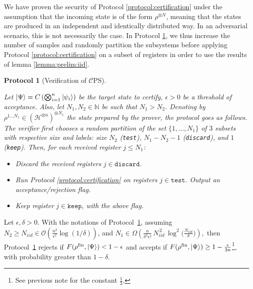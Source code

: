 \documentclass[a4paper,twocolumn,11pt,unpublished]{quantumarticle}
\newtheorem{protocol}{Protocol}
\newcommand{\Hilbert}{\mathcal H}
\newcommand{\CEPS}{$\mathcal C$PS}
\newcommand{\qubit}{i}
\renewcommand{\O}{\mathcal O}
\begin{document}
We have proven the security of Protocol \ref{protocol:certification} under the assumption that the incoming state is of the form $\rho^{\otimes N}$, meaning that the states are produced in an independent and identically distributed way. In an adversarial scenario, this is not necessarily the case. In Protocol \ref{protocol:verification}, we thus increase the number of samples and randomly partition the subsystems before applying Protocol \ref{protocol:certification} on a subset of registers in order to use the results of lemma \ref{lemma:prelim:iid}.

\begin{protocol}[Verification of \CEPS]
\label{protocol:verification}

Let $\ket\Psi = C\left(\bigotimes_{\qubit=1}^n\ket{\psi_\qubit}\right)$ be the target state to certify, $\epsilon>0$ be a threshold of acceptance. Also, let $N_1,N_2\in\mathbb N$ be such that $N_1>N_2$. Denoting by $\rho^{1\ldots N_1}\in(\Hilbert^{\otimes n})^{\otimes N_1}$ the state prepared by the prover,
the protocol goes as follows. The verifier first chooses a random partition of the set $\{1, \ldots, N_1\}$ of $3$ subsets with respective size and labels: 
size $N_{2}$ (\texttt{test}), $N_1-N_2-1$ (\texttt{discard}), and $1$ (\texttt{keep}). Then, for each received register $j\leq N_1$:
\begin{itemize}
    \item Discard the received registers $j\in \texttt{discard}$.
    \item Run Protocol \ref{protocol:certification} on registers $j\in \texttt{test}$. Output an acceptance/rejection flag.
    \item Keep register $j\in\texttt{keep}$, with the above flag.
\end{itemize}
\end{protocol}
     \begin{theorem}[Efficient verification of \CEPS]
            Let $\epsilon,\delta>0$. With the notations of Protocol~\ref{protocol:verification}, assuming 
            $N_2\ge N_{iid}\in\O(\frac{n^2}{\epsilon^2}\log(1/\delta))$,
            and
            \(
            N_1\in\Omega\!\left(
            \frac{n}{\delta^2\epsilon^2}\,N_{{iid}}^{\,2}\,
            \log^2\!\Big(\frac{N_{{iid}}}{\delta}\Big)
            \right),
            \)
            then Protocol~\ref{protocol:verification} rejects if $F(\rho^{\mathrm{fin}},\ket\Psi)<1-\epsilon$ and accepts if $F(\rho^{\mathrm{fin}},\ket\Psi)\ge1-\frac\epsilon{3n}$\footnote{See previous note for the constant $\frac13$.}, with probability greater than $1-\delta$.
        \end{theorem}
\end{document}
